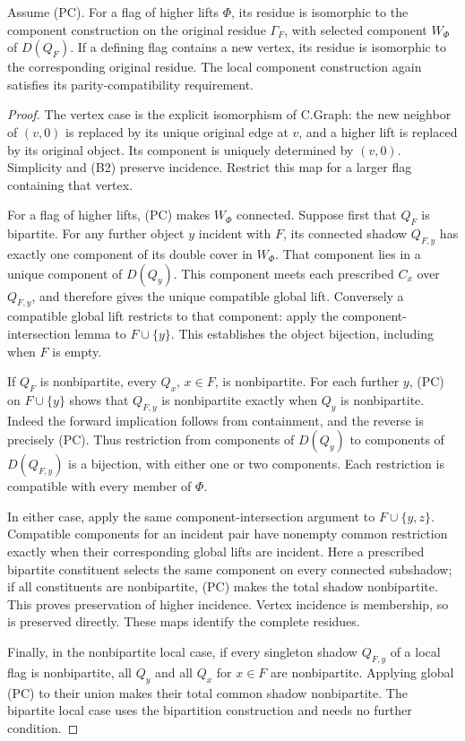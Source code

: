 \begin{theorem}\label{NC.transport}
Assume (PC). For a flag of higher lifts $\Phi$, its residue is
isomorphic to the component construction on the original residue
$\Gamma_F$, with selected component $W_\Phi$ of $D(Q_F)$.
If a defining flag contains a new vertex, its residue is isomorphic
to the corresponding original residue. The local component construction
again satisfies its parity-compatibility requirement.
\end{theorem}
\begin{proof}
The vertex case is the explicit isomorphism of C.Graph: the new
neighbor of $(v,0)$ is replaced by its unique original edge at $v$,
and a higher lift is replaced by its original object. Its component
is uniquely determined by $(v,0)$. Simplicity and (B2) preserve
incidence. Restrict this map for a larger flag containing that vertex.

For a flag of higher lifts, (PC) makes $W_\Phi$ connected. Suppose
first that $Q_F$ is bipartite. For any further object $y$ incident
with $F$, its connected shadow $Q_{F,y}$ has exactly one component
of its double cover in $W_\Phi$. That component lies in a unique
component of $D(Q_y)$. This component meets each prescribed $C_x$
over $Q_{F,y}$, and therefore gives the unique compatible global
lift. Conversely a compatible global lift restricts to that component:
apply the component-intersection lemma to $F\cup\{y\}$. This
establishes the object bijection, including when $F$ is empty.

If $Q_F$ is nonbipartite, every $Q_x$, $x\in F$, is nonbipartite.
For each further $y$, (PC) on $F\cup\{y\}$ shows that $Q_{F,y}$
is nonbipartite exactly when $Q_y$ is nonbipartite. Indeed the forward
implication follows from containment, and the reverse is precisely
(PC). Thus restriction from components of $D(Q_y)$ to components
of $D(Q_{F,y})$ is a bijection, with either one or two components.
Each restriction is compatible with every member of $\Phi$.

In either case, apply the same component-intersection argument to
$F\cup\{y,z\}$. Compatible components for an incident pair have
nonempty common restriction exactly when their corresponding global
lifts are incident. Here a prescribed bipartite constituent selects
the same component on every connected subshadow; if all constituents
are nonbipartite, (PC) makes the total shadow nonbipartite. This proves
preservation of higher incidence. Vertex incidence is membership, so
is preserved directly. These maps identify the complete residues.

Finally, in the nonbipartite local case, if every singleton shadow
$Q_{F,y}$ of a local flag is nonbipartite, all $Q_y$ and all $Q_x$
for $x\in F$ are nonbipartite. Applying global (PC) to their union
makes their total common shadow nonbipartite. The bipartite local
case uses the bipartition construction and needs no further condition.
\end{proof}

